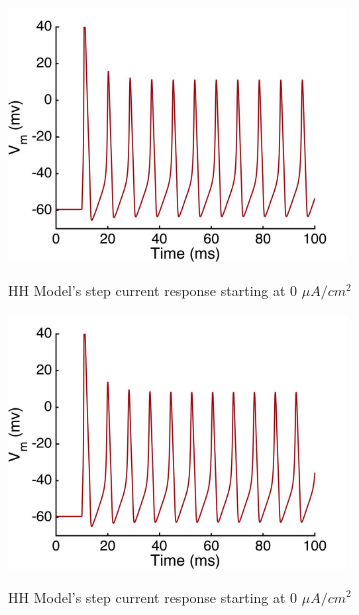 \documentclass{beamer}
\begin{document}
\begin{frame}
  \begin{figure}
    \centering
    \includegraphics[width = 0.8\textwidth]{./images/current_0_55.jpg}

    HH Model's step current response starting at 0 $\mu A/cm^2$
  \end{figure}
\end{frame}


\begin{frame}
  \begin{figure}
    \centering
    \includegraphics[width = 0.8\textwidth]{./images/current_0_60.jpg}

    HH Model's step current response starting at 0 $\mu A/cm^2$
  \end{figure}
\end{frame}
\end{document}
